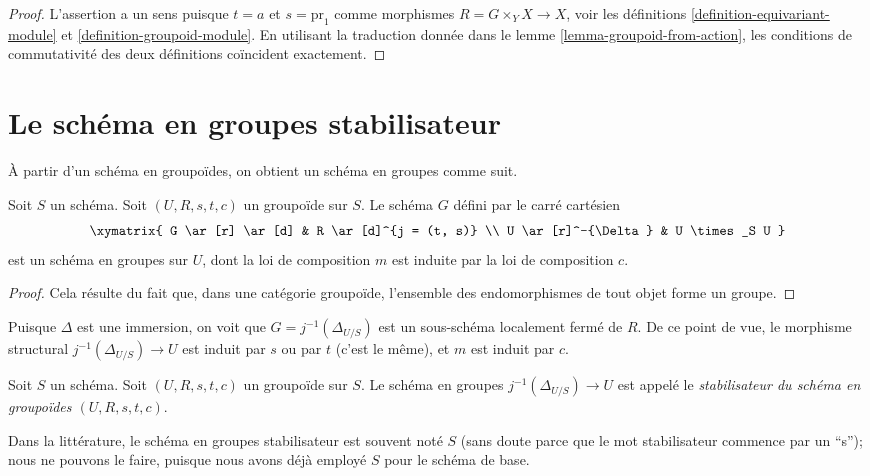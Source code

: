 \begin{proof}
L'assertion a un sens puisque $t = a$ et $s = \text{pr}_1$
comme morphismes $R = G \times_Y X \to X$, voir les
définitions \ref{definition-equivariant-module} et
\ref{definition-groupoid-module}.
En utilisant la traduction donnée dans le lemme \ref{lemma-groupoid-from-action},
les conditions de commutativité
des deux définitions coïncident exactement.
\end{proof}





\section{Le schéma en groupes stabilisateur}
\label{section-stabilizer}

\noindent
À partir d'un schéma en groupoïdes, on obtient un schéma en groupes comme suit.

\begin{lemma}
\label{lemma-groupoid-stabilizer}
Soit $S$ un schéma.
Soit $(U, R, s, t, c)$ un groupoïde sur $S$.
Le schéma $G$ défini par le carré cartésien
$$
\xymatrix{
G \ar[r] \ar[d] & R \ar[d]^{j = (t, s)} \\
U \ar[r]^-{\Delta} & U \times_S U
}
$$
est un schéma en groupes sur $U$, dont la loi de composition
$m$ est induite par la loi de composition $c$.
\end{lemma}

\begin{proof}
Cela résulte du fait que, dans une catégorie groupoïde, l'ensemble
des endomorphismes de tout objet forme un groupe.
\end{proof}

\noindent
Puisque $\Delta$ est une immersion, on voit que $G = j^{-1}(\Delta_{U/S})$
est un sous-schéma localement fermé de $R$. De ce point de vue,
le morphisme structural $j^{-1}(\Delta_{U/S}) \to U$ est induit par
$s$ ou par $t$ (c'est le même), et $m$ est induit par $c$.

\begin{definition}
\label{definition-stabilizer-groupoid}
Soit $S$ un schéma.
Soit $(U, R, s, t, c)$ un groupoïde sur $S$.
Le schéma en groupes $j^{-1}(\Delta_{U/S})\to U$
est appelé le {\it stabilisateur du schéma en groupoïdes
$(U, R, s, t, c)$}.
\end{definition}

\noindent
Dans la littérature, le schéma en groupes stabilisateur est souvent noté $S$
(sans doute parce que le mot stabilisateur commence par un ``s'');
nous ne pouvons le faire, puisque nous avons déjà employé $S$ pour le schéma de base.

